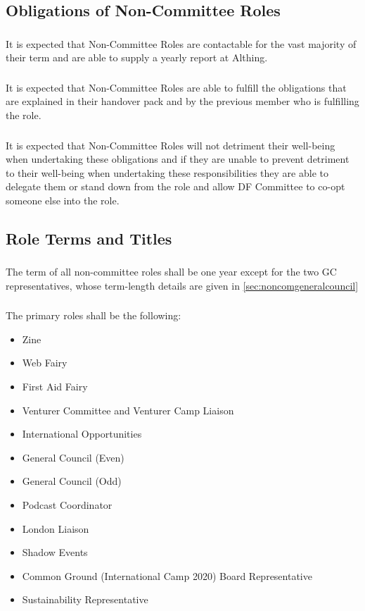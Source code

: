 \documentclass[a4paper, 11pt]{report}
\begin{document}
\subsection{Obligations of Non-Committee Roles}
\subsubsection{}
It is expected that Non-Committee Roles are contactable for the vast majority of their term and are able to supply a yearly report at Althing.
\subsubsection{}
It is expected that Non-Committee Roles are able to fulfill the obligations that are explained in their handover pack and by the previous member who is fulfilling the role.
\subsubsection{}
It is expected that Non-Committee Roles will not detriment their well-being when undertaking these obligations and if they are unable to prevent detriment to their well-being when undertaking these responsibilities they are able to delegate them or stand down from the role and allow DF Committee to co-opt someone else into the role.

\subsection{Role Terms and Titles}
\subsubsection{}
The term of all non-committee roles shall be one year except for the two GC representatives, whose term-length details are given in \ref{sec:noncomgeneralcouncil}
\subsubsection{} The primary roles shall be the following:

\begin{itemize}
\item Zine
\item Web Fairy
\item First Aid Fairy
\item Venturer Committee and Venturer Camp Liaison
\item International Opportunities
\item General Council (Even)
\item General Council (Odd)
\item Podcast Coordinator
\item London Liaison
\item Shadow Events
\item Common Ground (International Camp 2020) Board Representative
\item Sustainability Representative
\end{itemize}
\end{document}
